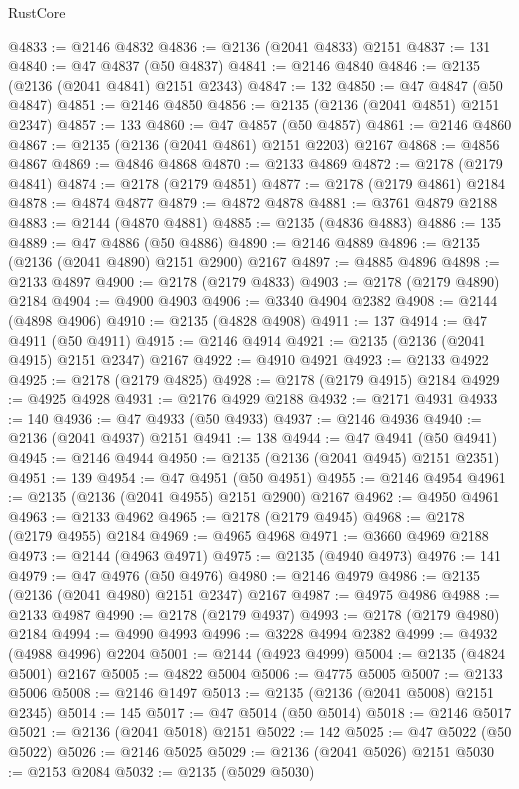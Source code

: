 \begin{lexlean}{RustCore}
\begin{coremodule}
@4833 := @2146 @4832
@4836 := @2136 (@2041 @4833) @2151
@4837 := 131
@4840 := @47 @4837 (@50 @4837)
@4841 := @2146 @4840
@4846 := @2135 (@2136 (@2041 @4841) @2151 @2343)
@4847 := 132
@4850 := @47 @4847 (@50 @4847)
@4851 := @2146 @4850
@4856 := @2135 (@2136 (@2041 @4851) @2151 @2347)
@4857 := 133
@4860 := @47 @4857 (@50 @4857)
@4861 := @2146 @4860
@4867 := @2135 (@2136 (@2041 @4861) @2151 @2203) @2167
@4868 := @4856 @4867
@4869 := @4846 @4868
@4870 := @2133 @4869
@4872 := @2178 (@2179 @4841)
@4874 := @2178 (@2179 @4851)
@4877 := @2178 (@2179 @4861) @2184
@4878 := @4874 @4877
@4879 := @4872 @4878
@4881 := @3761 @4879 @2188
@4883 := @2144 (@4870 @4881)
@4885 := @2135 (@4836 @4883)
@4886 := 135
@4889 := @47 @4886 (@50 @4886)
@4890 := @2146 @4889
@4896 := @2135 (@2136 (@2041 @4890) @2151 @2900) @2167
@4897 := @4885 @4896
@4898 := @2133 @4897
@4900 := @2178 (@2179 @4833)
@4903 := @2178 (@2179 @4890) @2184
@4904 := @4900 @4903
@4906 := @3340 @4904 @2382
@4908 := @2144 (@4898 @4906)
@4910 := @2135 (@4828 @4908)
@4911 := 137
@4914 := @47 @4911 (@50 @4911)
@4915 := @2146 @4914
@4921 := @2135 (@2136 (@2041 @4915) @2151 @2347) @2167
@4922 := @4910 @4921
@4923 := @2133 @4922
@4925 := @2178 (@2179 @4825)
@4928 := @2178 (@2179 @4915) @2184
@4929 := @4925 @4928
@4931 := @2176 @4929 @2188
@4932 := @2171 @4931
@4933 := 140
@4936 := @47 @4933 (@50 @4933)
@4937 := @2146 @4936
@4940 := @2136 (@2041 @4937) @2151
@4941 := 138
@4944 := @47 @4941 (@50 @4941)
@4945 := @2146 @4944
@4950 := @2135 (@2136 (@2041 @4945) @2151 @2351)
@4951 := 139
@4954 := @47 @4951 (@50 @4951)
@4955 := @2146 @4954
@4961 := @2135 (@2136 (@2041 @4955) @2151 @2900) @2167
@4962 := @4950 @4961
@4963 := @2133 @4962
@4965 := @2178 (@2179 @4945)
@4968 := @2178 (@2179 @4955) @2184
@4969 := @4965 @4968
@4971 := @3660 @4969 @2188
@4973 := @2144 (@4963 @4971)
@4975 := @2135 (@4940 @4973)
@4976 := 141
@4979 := @47 @4976 (@50 @4976)
@4980 := @2146 @4979
@4986 := @2135 (@2136 (@2041 @4980) @2151 @2347) @2167
@4987 := @4975 @4986
@4988 := @2133 @4987
@4990 := @2178 (@2179 @4937)
@4993 := @2178 (@2179 @4980) @2184
@4994 := @4990 @4993
@4996 := @3228 @4994 @2382
@4999 := @4932 (@4988 @4996) @2204
@5001 := @2144 (@4923 @4999)
@5004 := @2135 (@4824 @5001) @2167
@5005 := @4822 @5004
@5006 := @4775 @5005
@5007 := @2133 @5006
@5008 := @2146 @1497
@5013 := @2135 (@2136 (@2041 @5008) @2151 @2345)
@5014 := 145
@5017 := @47 @5014 (@50 @5014)
@5018 := @2146 @5017
@5021 := @2136 (@2041 @5018) @2151
@5022 := 142
@5025 := @47 @5022 (@50 @5022)
@5026 := @2146 @5025
@5029 := @2136 (@2041 @5026) @2151
@5030 := @2153 @2084
@5032 := @2135 (@5029 @5030)

\end{coremodule}
\end{lexlean}
